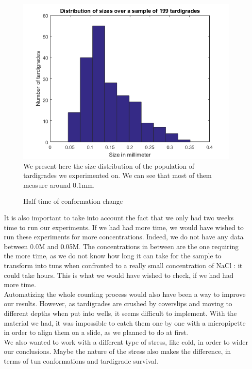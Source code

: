 \documentclass[12pt,a4paper, twocolumn]{article}
\begin{document}
\begin{figure}
\includegraphics[width=\linewidth]{pop.png}
\label{pop}
We present here the size distribution of the population of tardigrades we experimented on. We can see that most of them measure around $0.1$mm.
\caption{Half time of conformation change}
\end{figure}


It is also important to take into account the fact that we only had two weeks time to run our experiments. If we had had more time, we would have wished to run these experiments for more concentrations. Indeed, we do not have any data between 0.0M and 0.05M. The concentrations in between are the one requiring the more time, as we do not know how long it can take for the sample to transform into tuns when confronted to a really small concentration of NaCl : it could take hours. This is what we would have wished to check, if we had had more time.\\

Automatizing the whole counting process would also have been a way to improve our results. However, as tardigrades are crushed by coverslips and moving to different depths when put into wells, it seems difficult to implement. With the material we had, it was impossible to catch them one by one with a micropipette in order to align them on a slide, as we planned to do at first. \\

We also wanted to work with a different type of stress, like cold, in order to wider our conclusions. Maybe the nature of the stress also makes the difference, in terms of tun conformations and tardigrade survival.\\
\end{document}
